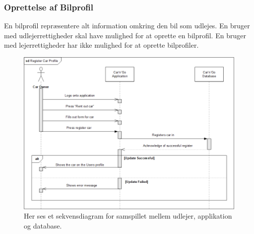 \documentclass[Arkitektur/System_main.tex]{subfiles}
\begin{document}
\subsubsection{Oprettelse af Bilprofil}
En bilprofil repræsentere alt information omkring den bil som udlejes. En bruger med udlejerrettigheder skal have mulighed for at oprette en bilprofil. En bruger med lejerrettigheder har ikke mulighed for at oprette bilprofiler. 
\begin{figure}[H]
    \centering
    \includegraphics[width=1\textwidth]{Arkitektur/Softwarearkitektur/Car_registration/graphics/RegisterCarSD.png}
    \caption{Her ses et sekvensdiagram for samspillet mellem udlejer, applikation og database. }
    \label{fig:RegisterCarProfileSD}
\end{figure}
\end{document}
